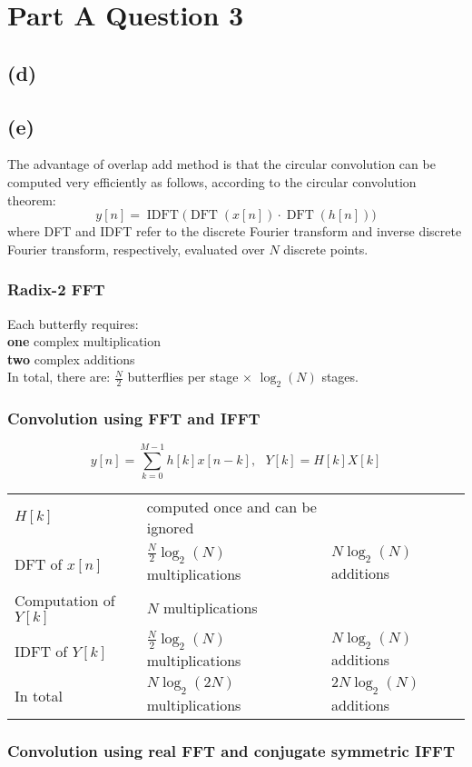 \documentclass{article}
\DeclareMathOperator{\DFT}{DFT}
\DeclareMathOperator{\IDFT}{IDFT}
\newenvironment{homeworkProblem}[1]{
	\section*{#1}
	}{
}
\newenvironment{homeworkSection}[1]{
	\subsection*{#1}
	}{
}
\begin{document}
\begin{homeworkProblem}{Part A Question 3}
\begin{homeworkSection}{(d)}
\end{homeworkSection}


\begin{homeworkSection}{(e)}

The advantage of overlap add method is that the circular convolution can be computed very efficiently as follows, according to the circular convolution theorem:
\begin{equation}
y[n] = \IDFT\Big(\DFT(x[n])\cdot\DFT(h[n])\Big)
\end{equation}
where DFT and IDFT refer to the discrete Fourier transform and inverse discrete Fourier transform, respectively, evaluated over $N$ discrete points.

\subsubsection*{Radix-2 FFT}
Each butterfly requires:\\
\textbf{one} complex multiplication\\
\textbf{two} complex additions\\

In total, there are: $\frac{N}{2}$ butterflies per stage $\times$ $\log_2(N)$ stages.


\subsubsection*{Convolution using FFT and IFFT}
\begin{equation}
y[n] = \sum_{k=0}^{M-1} h[k]x[n-k],\ \ \ Y[k] = H[k]X[k]
\end{equation}
\begin{tabular}{l l l}
$H[k]$ &computed once and can be ignored\\
DFT of $x[n]$ &$\frac{N}{2} \log_2(N)$ multiplications &$N \log_2(N)$ additions\\
Computation of $Y[k]$ &$N$ multiplications\\
IDFT of $Y[k]$ &$\frac{N}{2} \log_2(N)$ multiplications &$N \log_2(N)$ additions\\
In total &$N \log_2(2N)$ multiplications &$2N \log_2(N)$ additions
\end{tabular}


\subsubsection*{Convolution using real FFT and conjugate symmetric IFFT}


\end{homeworkSection}
\end{homeworkProblem}
\end{document}
